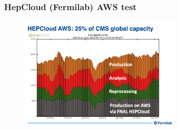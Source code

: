 \begin{frame}
\frametitle{HepCloud (Fermilab) AWS test}

\begin{figure}[htbp]
\begin{center}
\includegraphics[width=0.7\textwidth]{images/hepcloud-aws.png}
\end{center}
\end{figure}

\end{frame}


